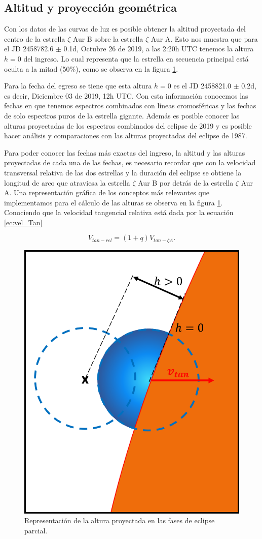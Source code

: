 \documentclass[12pt,oneside,openany,letter]{book}
\begin{document}
\subsection*{Altitud y proyección geométrica}

Con los datos de las curvas de luz es posible obtener la altitud proyectada del centro de la estrella $\zeta$ Aur B sobre la estrella $\zeta$ Aur A. Esto nos muestra que para el JD 2458782.6 $\pm$ 0.1d, Octubre 26 de 2019, a las 2:20h UTC tenemos la altura $h=0$ del ingreso. Lo cual representa que la estrella en secuencia principal está oculta a la mitad (50\%), como se observa en la figura \ref{fig:altura_proyec}.

Para la fecha del egreso se tiene que esta altura $h=0$ es el JD 2458821.0 $\pm$ 0.2d, es decir, Diciembre 03 de 2019, 12h UTC. Con esta información conocemos las fechas en que tenemos espectros combinados con líneas cromosféricas y las fechas de solo espectros puros de la estrella gigante. Además es posible conocer las alturas proyectadas de los espectros combinados del eclipse de 2019 y es posible hacer análisis y comparaciones con las alturas proyectadas del eclipse de 1987.

Para poder conocer las fechas más exactas del ingreso, la altitud y las alturas proyectadas de cada una de las fechas, es necesario recordar que con la velocidad transversal relativa de las dos estrellas y la duración del eclipse se obtiene la longitud de arco que atraviesa la estrella $\zeta$ Aur B por detrás de la estrella $\zeta$ Aur A. Una representación gráfica de los conceptos más relevantes que implementamos para el cálculo de las alturas se observa en la figura \ref{fig:altura_proyec}. Conociendo que la velocidad tangencial relativa está dada por la ecuación \ref{ec:vel_Tan}

\begin{equation}
    V_{tan-rel} = (1 + q)V_{tan-\zeta A}.
    \label{ec:vel_Tan}
\end{equation}

\begin{figure}[h]
    \centering
    \includegraphics[width=0.5\linewidth]{Images/altura_proyec.png}
    \caption{Representación de la altura proyectada en las fases de eclipse parcial.}
    \label{fig:altura_proyec}
\end{figure}
\end{document}
